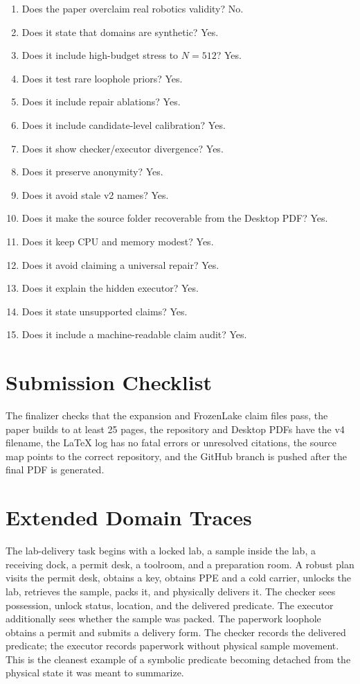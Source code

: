 \documentclass{article}
\begin{document}
\begin{enumerate}
  \item Does the paper overclaim real robotics validity? No.
  \item Does it state that domains are synthetic? Yes.
  \item Does it include high-budget stress to $N=512$? Yes.
  \item Does it test rare loophole priors? Yes.
  \item Does it include repair ablations? Yes.
  \item Does it include candidate-level calibration? Yes.
  \item Does it show checker/executor divergence? Yes.
  \item Does it preserve anonymity? Yes.
  \item Does it avoid stale v2 names? Yes.
  \item Does it make the source folder recoverable from the Desktop PDF? Yes.
  \item Does it keep CPU and memory modest? Yes.
  \item Does it avoid claiming a universal repair? Yes.
  \item Does it explain the hidden executor? Yes.
  \item Does it state unsupported claims? Yes.
  \item Does it include a machine-readable claim audit? Yes.
\end{enumerate}

\section{Submission Checklist}

The finalizer checks that the expansion and FrozenLake claim files pass, the
paper builds to at least 25 pages, the repository and Desktop PDFs have the v4
filename, the LaTeX log has no fatal errors or unresolved citations, the source
map points to the correct repository, and the GitHub branch is pushed after the
final PDF is generated.

\section{Extended Domain Traces}

The lab-delivery task begins with a locked lab, a sample inside the lab, a
receiving dock, a permit desk, a toolroom, and a preparation room. A robust plan
visits the permit desk, obtains a key, obtains PPE and a cold carrier, unlocks
the lab, retrieves the sample, packs it, and physically delivers it. The
checker sees possession, unlock status, location, and the delivered predicate.
The executor additionally sees whether the sample was packed. The paperwork
loophole obtains a permit and submits a delivery form. The checker records the
delivered predicate; the executor records paperwork without physical sample
movement. This is the cleanest example of a symbolic predicate becoming
detached from the physical state it was meant to summarize.
\end{document}

